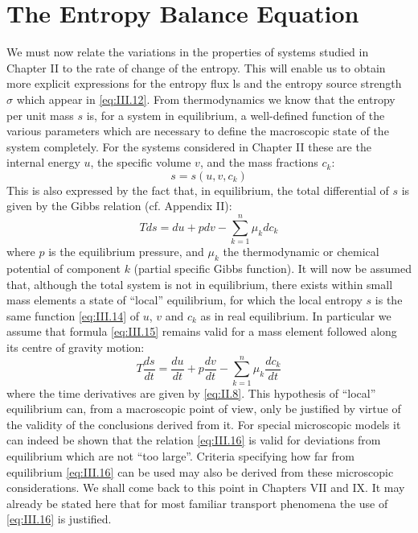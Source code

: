 \section{The Entropy Balance Equation}
We must now relate the variations in the properties of systems
studied in Chapter II to the rate of change of the entropy. This will
enable us to obtain more explicit expressions for the entropy flux ls
and the entropy source strength $\sigma$ which appear in \eqref{eq:III.12}.
From thermodynamics we know that the entropy per unit mass $s$ is,
for a system in equilibrium, a well-defined function of the various
parameters which are necessary to define the macroscopic state of the
system completely. For the systems considered in Chapter II these
are the internal energy $u$, the specific volume $v$, and the mass fractions $c_k$:
\begin{equation}
s = s(u, v, c_k)
    \label{eq:III.14}
\end{equation}
This is also expressed by the fact that, in equilibrium, the total differential of $s$ is given by the Gibbs relation (cf. Appendix II):
\begin{equation}
T ds = du + pdv - \sum_{k=1}^{n} \mu_k d c_k
    \label{eq:III.15}
\end{equation}
where $p$ is the equilibrium pressure, and $\mu_k$ the thermodynamic or
chemical potential of component $k$ (partial specific Gibbs function).
It will now be assumed that, although the total system is not in
equilibrium, there exists within small mass elements a state of ``local'' equilibrium, for which the local entropy $s$ is the same function \eqref{eq:III.14} of $u$, $v$ and $c_k$ as in real equilibrium. In particular we assume that formula \eqref{eq:III.15} remains valid for a mass element followed along its centre of gravity motion:
\begin{equation}
T \frac{ds}{dt} = \frac{du}{dt} + p\frac{dv}{dt} - \sum_{k=1}^{n} \mu_k \frac{d c_k}{dt}
    \label{eq:III.16}
\end{equation}
where the time derivatives are given by \eqref{eq:II.8}. This hypothesis of ``local'' equilibrium can, from a macroscopic point of view, only be justified by virtue of the validity of the conclusions derived from it. For special microscopic models it can indeed be shown that the relation \eqref{eq:III.16} is valid for deviations from equilibrium which are not ``too large''. Criteria specifying how far from equilibrium \eqref{eq:III.16} can be used may also be derived from these microscopic considerations. We shall come back to this point in Chapters VII and IX. It may already be stated here that for most familiar transport phenomena the use of \eqref{eq:III.16} is justified.

